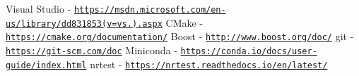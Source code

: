 Visual Studio -\/ \href{https://msdn.microsoft.com/en-us/library/dd831853(v=vs.100).aspx}{\tt https\+://msdn.\+microsoft.\+com/en-\/us/library/dd831853(v=vs.).\+aspx} C\+Make -\/ \href{https://cmake.org/documentation/}{\tt https\+://cmake.\+org/documentation/} Boost -\/ \href{http://www.boost.org/doc/}{\tt http\+://www.\+boost.\+org/doc/} git -\/ \href{https://git-scm.com/doc}{\tt https\+://git-\/scm.\+com/doc} Miniconda -\/ \href{https://conda.io/docs/user-guide/index.html}{\tt https\+://conda.\+io/docs/user-\/guide/index.\+html} nrtest -\/ \href{https://nrtest.readthedocs.io/en/latest/}{\tt https\+://nrtest.\+readthedocs.\+io/en/latest/} 